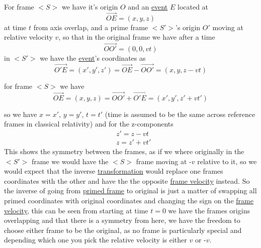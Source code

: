 For frame $<S>$ we have it's origin $O$ and an \hyperlink{def-event}{event} $E$ located at
\begin{equation}%
	\overrightarrow{OE}=(x,y,z)
\end{equation}%
at time $t$ from axis overlap, and a prime frame $<S'>$'s origin $O'$ moving at relative velocity $v$, so that in the original frame we have after a time
\begin{equation}%
	\overrightarrow{OO'}=(0,0,vt)
\end{equation}%
in $<S'>$ we have the \hyperlink{def-event}{event}'s coordinates as
\begin{equation}%
	\overrightarrow{O'E} = (x',y',z') = \overrightarrow{OE} - \overrightarrow{OO'}  = (x,y,z-vt)
	\label{eq: classical event}
\end{equation}%

for frame $<S>$ we have
\begin{equation}%
	\overrightarrow{OE} = (x,y,z) = \overrightarrow{OO'} + \overrightarrow{O'E} = (x',y',z'+vt')
	\label{eq: classical event 2}
\end{equation}%

so we have $x=x'$, $y=y'$, $t=t'$ (time is assumed to be the same across reference frames in classical relativity) and for the z-components
\begin{equation}%
	\begin{aligned}
		 & z' = z - vt \\
		 & z = z'+vt'
	\end{aligned}
\end{equation}%
This shows the symmetry between the frames, as if we where originally in the $<S'>$ frame we would have the $<S>$ frame moving at -$v$ relative to it, so we would expect that the inverse \hyperlink{def-transform}{transformation} would replace one frames coordinates with the other and have the the opposite \hyperlink{def-frame-velocity}{frame velocity} instead.
So the inverse of going from \hyperlink{def-Primed-Frame}{primed frame} to original is just a matter of swapping all primed coordinates with original coordinates and changing the sign on the \hyperlink{def-frame-velocity}{frame velocity}, this can be seen from starting at time $t=0$ we have the frames origins overlapping and that there is a symmetry from here, we have the freedom to choose either frame to be the original, as no frame is particularly special and depending which one you pick the relative velocity is either $v$ or -$v$.

